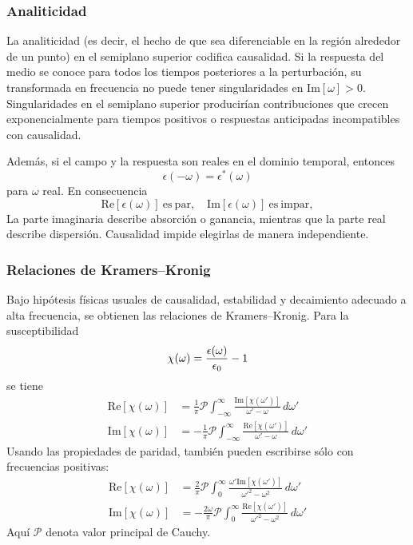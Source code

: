 \documentclass[]{article}
\numberwithin{equation}{section}
\begin{document}
\subsubsection{Analiticidad}
La analiticidad (es decir, el hecho de que sea diferenciable en la región alrededor de un punto) en el semiplano superior codifica causalidad. Si la respuesta del medio se conoce para todos los tiempos posteriores a la perturbación, su transformada en frecuencia no puede tener singularidades en $\mathrm{Im}\!\left[\omega\right] > 0$. Singularidades en el semiplano superior producirían contribuciones que crecen exponencialmente para tiempos positivos o respuestas anticipadas incompatibles con causalidad.

Además, si el campo y la respuesta son reales en el dominio temporal, entonces
\begin{equation}
	\epsilon(-\omega) = \epsilon^*(\omega)
\end{equation}
para $\omega$ real. En consecuencia
\begin{equation*}
	\mathrm{Re}\!\left[\epsilon(\omega)\right] \mathrm{\ es \ par}, \quad \mathrm{Im}\!\left[\epsilon(\omega)\right] \mathrm{\ es \ impar}, 
\end{equation*}
La parte imaginaria describe absorción o ganancia, mientras que la parte real describe dispersión. Causalidad impide elegirlas de manera independiente.

\subsubsection{Relaciones de Kramers–Kronig}
Bajo hipótesis físicas usuales de causalidad, estabilidad y decaimiento adecuado a alta frecuencia, se obtienen las relaciones de Kramers–Kronig. Para la susceptibilidad
\begin{equation}
	\chi(\omega) = \frac{\epsilon(\omega)}{\epsilon_{0}} - 1
\end{equation}
se tiene
\begin{align}
	\mathrm{Re}\!\left[\chi(\omega)\right] &= \frac{1}{\pi} \mathcal{P} \int_{-\infty}^{\infty} \frac{\mathrm{Im}\! \left[\chi(\omega') \right]}{\omega' - \omega} \, d\omega'\\
	\mathrm{Im}\!\left[\chi(\omega)\right] &= -\frac{1}{\pi} \mathcal{P} \int_{-\infty}^{\infty} \frac{\mathrm{Re}\! \left[\chi(\omega') \right]}{\omega' - \omega} \, d\omega'
\end{align}
Usando las propiedades de paridad, también pueden escribirse sólo con frecuencias positivas:
\begin{align}
	\mathrm{Re}\!\left[\chi(\omega)\right] &= \frac{2}{\pi} \mathcal{P} \int_{0}^{\infty} \frac{\omega' \mathrm{Im}\! \left[\chi(\omega') \right]}{\omega'^2 - \omega^2} \, d\omega'\\
	\mathrm{Im}\!\left[\chi(\omega)\right] &= -\frac{2\omega}{\pi} \mathcal{P} \int_{0}^{\infty} \frac{\mathrm{Re}\! \left[\chi(\omega') \right]}{\omega'^2 - \omega^2} \, d\omega'
\end{align}
Aquí $\mathcal{P}$ denota valor principal de Cauchy.
\end{document}
